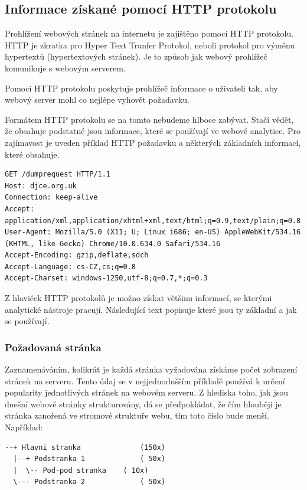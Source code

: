 \documentclass[bc,male,java,dept456]{diploma}						%
\begin{document}
  
\subsection{Informace získané pomocí HTTP protokolu}

Prohlížení webových stránek na internetu je zajišťěno pomocí HTTP protokolu. HTTP je zkratka pro Hyper Text Tranfer Protokol, neboli protokol pro výměnu hypertextů (hypertextových stránek). Je to způsob jak webový prohlížeč komunikuje s webovým serverem.

Pomocí HTTP protokolu poskytuje prohlížeč informace o uživateli tak, aby webový server mohl co nejlépe vyhovět požadavku.

Formátem HTTP protokolu se na tomto nebudeme hlboce zabývat. Stačí vědět, že obsahuje podstatné jsou informace, které se používají ve webové analytice. Pro zajímavost je uveden příklad HTTP požadavku a některých základních informací, které obsahuje.

\bigskip

\begin{lstlisting}[label=src:Plain,caption=Ukázka HTTP požadavku]
GET /dumprequest HTTP/1.1
Host: djce.org.uk
Connection: keep-alive
Accept: application/xml,application/xhtml+xml,text/html;q=0.9,text/plain;q=0.8,image/png,*/*;q=0.5
User-Agent: Mozilla/5.0 (X11; U; Linux i686; en-US) AppleWebKit/534.16 (KHTML, like Gecko) Chrome/10.0.634.0 Safari/534.16
Accept-Encoding: gzip,deflate,sdch
Accept-Language: cs-CZ,cs;q=0.8
Accept-Charset: windows-1250,utf-8;q=0.7,*;q=0.3
\end{lstlisting}

Z hlaviček HTTP protokolů je možno získat většinu informací, se kterými analytické nástroje pracují. Následující text popisuje které jsou ty základní a jak se používají.

\subsubsection{Požadovaná stránka}

Zaznamenáváním, kolikrát je každá stránka vyžadována získáme počet zobrazení stránek na serveru. Tento údaj se v nejjednodušším příkladě používá k určení popularity jednotlivých stránek na webovém serveru. Z hlediska toho, jak jsou dnešní webové stránky strukturovány, dá se předpokládat, že čím hlouběji je stránka zanořená ve stromové struktuře webu, tím toto číslo bude menší. Například:

\begin{lstlisting}[label=src:Plain,caption=Distribuce návštěv ve stromové struktuře]
--+ Hlavni stranka 				(150x)
  |--+ Podstranka 1				( 50x)
  |  \-- Pod-pod stranka	( 10x)
  \--- Podstranka 2				( 50x)
\end{lstlisting}
\end{document}
